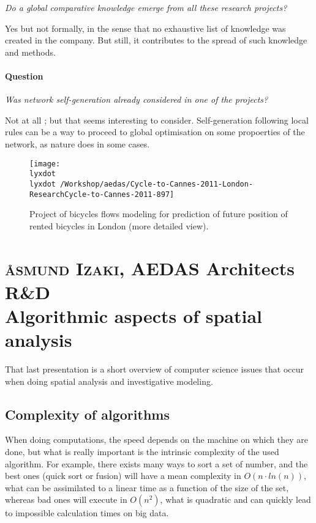 \documentclass[english]{article}
\newcommand{\noun}[1]{\textsc{#1}}
\newcommand{\lyxdot}{.}
\begin{document}
\textit{Do a global comparative knowledge emerge from all these research
projects?}

Yes but not formally, in the sense that no exhaustive list of knowledge
was created in the company. But still, it contributes to the spread
of such knowledge and methods.


\paragraph{Question}

\textit{Was network self-generation already considered in one of the
projects?}

Not at all ; but that seems interesting to consider. Self-generation
following local rules can be a way to proceed to global optimisation
on some propoerties of the network, as nature does in some cases.

\begin{figure}
\texttt{[image: \\lyxdot \\lyxdot /Workshop/aedas/Cycle-to-Cannes-2011-London-ResearchCycle-to-Cannes-2011-897]}\caption{Project of bicycles flows modeling for prediction of future position
of rented bicycles in London (more detailed view).}


\end{figure}


\newpage{}


\section*{\noun{{\aa}smund Izaki}, AEDAS Architects R\&D\protect \\
Algorithmic aspects of spatial analysis}

That last presentation is a short overview of computer science issues
that occur when doing spatial analysis and investigative modeling.


\subsection*{Complexity of algorithms}

When doing computations, the speed depends on the machine on which
they are done, but what is really important is the intrinsic complexity
of the used algorithm. For example, there exists many ways to sort
a set of number, and the best ones (quick sort or fusion) will have
a mean complexity in $O(n\cdot ln(n))$, what can be assimilated to
a linear time as a function of the size of the set, whereas bad ones
will execute in $O(n^{2})$, what is quadratic and can quickly lead
to impossible calculation times on big data.
\end{document}
